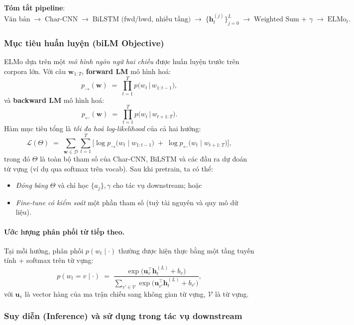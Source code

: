\noindent\textbf{Tóm tắt pipeline}:
\[
  \text{Văn bản} \;\to\; \text{Char-CNN} \;\to\; \text{BiLSTM (fwd/bwd, nhiều tầng)} \;\to\; 
  \{\mathbf{h}_t^{(j)}\}_{j=0}^{L} \;\to\; \text{Weighted Sum + }\gamma \;\to\; \text{ELMo}_t.
\]

\subsubsection{Mục tiêu huấn luyện (biLM Objective)}
\label{ssec:elmo_training}

ELMo dựa trên một \emph{mô hình ngôn ngữ hai chiều} được huấn luyện trước trên corpora lớn. Với câu $\mathbf{w}_{1:T}$, \textbf{forward LM} mô hình hoá:
\[
  p_{\rightarrow}(\mathbf{w}) \;=\; \prod_{t=1}^{T} p\big(w_t \,\big|\, w_{1:t-1}\big),
\]
và \textbf{backward LM} mô hình hoá:
\[
  p_{\leftarrow}(\mathbf{w}) \;=\; \prod_{t=1}^{T} p\big(w_t \,\big|\, w_{t+1:T}\big).
\]
Hàm mục tiêu tổng là \emph{tối đa hoá log-likelihood} của cả hai hướng:
\[
  \mathcal{L}(\Theta) 
  \;=\; \sum_{\mathbf{w}\in\mathcal{D}}
  \sum_{t=1}^{T} 
  \Big[
    \log p_{\rightarrow}\big(w_t \mid w_{1:t-1}\big) 
    \;+\; 
    \log p_{\leftarrow}\big(w_t \mid w_{t+1:T}\big)
  \Big],
\]
trong đó $\Theta$ là toàn bộ tham số của Char-CNN, BiLSTM và các đầu ra dự đoán từ vựng (ví dụ qua softmax trên vocab). Sau khi pretrain, ta có thể:
\begin{itemize}
  \item \emph{Đóng băng} $\Theta$ và chỉ học $\{a_j\},\gamma$ cho tác vụ downstream; hoặc
  \item \emph{Fine-tune có kiểm soát} một phần tham số (tuỳ tài nguyên và quy mô dữ liệu).
\end{itemize}

\paragraph{Ước lượng phân phối từ tiếp theo.}
Tại mỗi hướng, phân phối $p(w_t \mid \cdot)$ thường được hiện thực bằng một tầng tuyến tính + softmax trên từ vựng:
\[
  p(w_t = v \mid \cdot) \;=\; 
  \frac{\exp\big(\mathbf{u}_v^\top \mathbf{h}_t^{(L)} + b_v\big)}
       {\sum_{v'\in \mathcal{V}} \exp\big(\mathbf{u}_{v'}^\top \mathbf{h}_t^{(L)} + b_{v'}\big)},
\]
với $\mathbf{u}_v$ là vector hàng của ma trận chiếu sang không gian từ vựng, $\mathcal{V}$ là từ vựng.

\subsubsection{Suy diễn (Inference) và sử dụng trong tác vụ downstream}
\label{ssec:elmo_inference}


